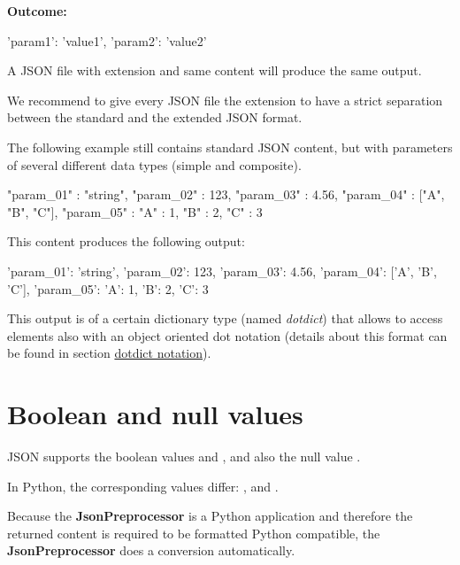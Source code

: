 \textbf{Outcome:}

\begin{pythonlog}
{'param1': 'value1', 'param2': 'value2'}
\end{pythonlog}

A JSON file with extension  and same content will produce the same output.

We recommend to give every JSON file the extension  to have a strict separation between the standard and the extended JSON format.

The following example still contains standard JSON content, but with parameters of several different data types (simple and composite).

\begin{pythoncode}
{
   "param_01" : "string",
   "param_02" : 123,
   "param_03" : 4.56,
   "param_04" : ["A", "B", "C"],
   "param_05" : {"A" : 1, "B" : 2, "C" : 3}
}
\end{pythoncode}

\newpage

This content produces the following output:

\begin{pythonlog}
{'param_01': 'string',
 'param_02': 123,
 'param_03': 4.56,
 'param_04': ['A', 'B', 'C'],
 'param_05': {'A': 1, 'B': 2, 'C': 3}}
\end{pythonlog}

This output is of a certain dictionary type (named \textit{dotdict}) that allows to access elements also with an object oriented dot notation
(details about this format can be found in section \hyperref[dotdict-notation]{dotdict notation}).


\newpage

\section{Boolean and null values}

JSON supports the boolean values  and , and also the null value .

In Python, the corresponding values differ: ,  and .

Because the \textbf{JsonPreprocessor} is a Python application and therefore the returned content is required to be formatted Python compatible,
the \textbf{JsonPreprocessor} does a conversion automatically.

